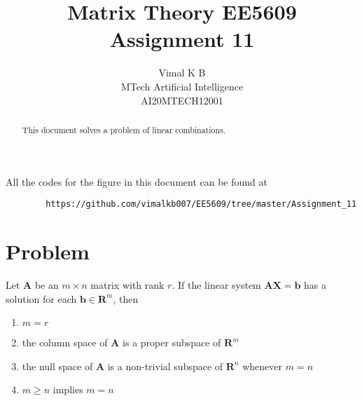 \documentclass[journal,12pt,twocolumn]{IEEEtran}
\begin{document}
	\makeatletter
	\makeatother
	\let\StandardTheFigure\thefigure
	\let\vec\mathbf
	\renewcommand{\thefigure}{\theproblem}
	\def\putbox#1#2#3{\makebox[0in][l]{\makebox[#1][l]{}\raisebox{\baselineskip}[0in][0in]{\raisebox{#2}[0in][0in]{#3}}}}
	\def\rightbox#1{\makebox[0in][r]{#1}}
	\def\centbox#1{\makebox[0in]{#1}}
	\def\topbox#1{\raisebox{-\baselineskip}[0in][0in]{#1}}
	\def\midbox#1{\raisebox{-0.5\baselineskip}[0in][0in]{#1}}
	\vspace{3cm}
	\title{Matrix Theory EE5609\\  Assignment 11}
	\author{Vimal K B\\MTech Artificial Intelligence\\AI20MTECH12001}
	\maketitle
	\newpage
	\bigskip
	\renewcommand{\thefigure}{\theenumi}
	\renewcommand{\thetable}{\theenumi}
	\begin{abstract}
		This document solves a problem of linear combinations. 
	\end{abstract}
	All the codes for the figure in this document can be found at
	\begin{lstlisting}
		https://github.com/vimalkb007/EE5609/tree/master/Assignment_11
	\end{lstlisting}
	\section{\textbf{Problem}}
	Let $\vec{A}$ be an $m\times n$ matrix with rank $r$. If the linear system $\vec{A}\vec{X} = \vec{b}$ has a solution for each $\vec{b} \in \mathbf{R}^{m}$, then
	\begin{enumerate}
		\item $m=r$
		\item the column space of $\vec{A}$ is a proper subspace of $\mathbf{R}^{m}$ 
		\item the null space of $\vec{A}$ is a non-trivial subspace of $\mathbf{R}^{n}$ whenever $m=n$
		\item $m\geq n$ implies $m=n$
	\end{enumerate}
\end{document}
